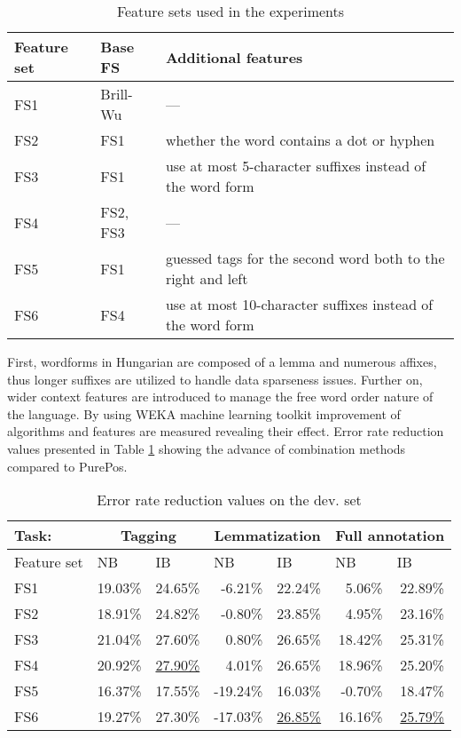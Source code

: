 \begin{table}[h]
\centering
\caption{Feature sets used in the experiments}\label{tab:feature-sets}
\begin{tabular}{l l l}
\hline
Feature set & Base FS & Additional features \\
\hline
FS1 & Brill-Wu & --- \\
FS2 & FS1 & whether the word contains a dot or hyphen \\
FS3 & FS1 & use at most 5-character suffixes instead of the word form \\
FS4 & FS2, FS3 & --- \\ 
FS5 & FS1 & guessed tags for the second word both to the right and left \\
FS6 & FS4 & use at most 10-character suffixes instead of the word form \\
\hline
\end{tabular}
\end{table}

First, wordforms in Hungarian are composed of a lemma and numerous affixes, thus longer suffixes are utilized to handle data sparseness issues. Further on, wider context features are introduced to manage the free word order nature of the language.  
By using WEKA machine learning toolkit \cite{Hall2009} improvement of algorithms and features are measured revealing their effect.
Error rate reduction values presented in Table \ref{tab:feature-sets} showing the advance of combination methods compared to PurePos. 

\begin{table}[h]
\centering
\caption{Error rate reduction values on the dev. set}\label{tab:reduction-rates}
\begin{tabular}{l r r r r r r}
\hline
Task:& \multicolumn{2}{c}{Tagging} & \multicolumn{2}{c}{Lemmatization} & \multicolumn{2}{c}{Full annotation} \\
\hline
Feature set & \multicolumn{1}{l}{NB} & \multicolumn{1}{l}{IB} & \multicolumn{1}{l}{NB} & \multicolumn{1}{l}{IB} & \multicolumn{1}{l}{NB} & \multicolumn{1}{l}{IB} \\
\hline
FS1 & 19.03\% & 24.65\% & -6.21\% & 22.24\% & 5.06\% & 22.89\% \\
FS2 & 18.91\% & 24.82\% & -0.80\% & 23.85\% & 4.95\% & 23.16\% \\
FS3 & 21.04\% & 27.60\% & 0.80\% & 26.65\% & 18.42\% & 25.31\% \\
FS4 & 20.92\% & \underline{27.90\%} & 4.01\% & 26.65\% & 18.96\% & 25.20\% \\
FS5 & 16.37\% & 17.55\% & -19.24\% & 16.03\% & -0.70\% & 18.47\% \\
FS6 & 19.27\% & 27.30\% & -17.03\% & \underline{26.85\%} & 16.16\% & \underline{25.79\%} \\
\hline
\end{tabular}
\end{table}

